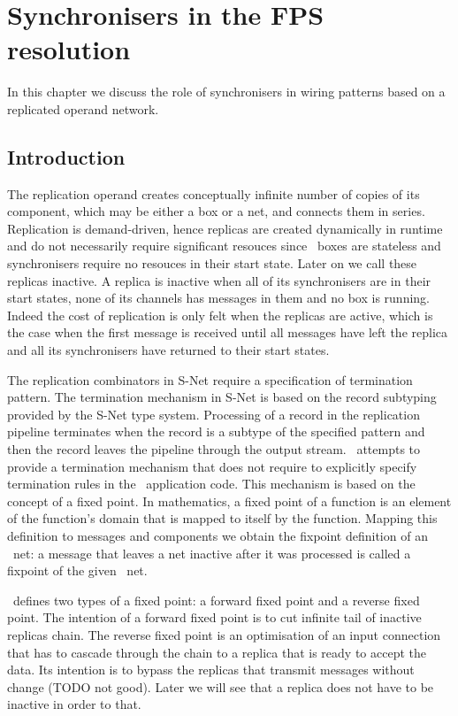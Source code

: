 \chapter{Synchronisers in the FPS resolution}

In this chapter we discuss the role of synchronisers in wiring patterns based on a replicated operand network.


    \section{Introduction}
The replication operand creates conceptually infinite number of copies of its component, which may be either a box or a net, and connects them in series. Replication is demand-driven, hence replicas are created dynamically in runtime and do not necessarily require significant resouces since \ak\ boxes are stateless and synchronisers require no resouces in their start state. Later on we call these replicas inactive. A replica is inactive when all of its synchronisers are in their start states, none of its channels has messages in them and no box is running. Indeed the cost of replication is only felt when the replicas are active, which is the case when the first message is received until all messages have left the replica and all its synchronisers have returned to their start states.

The replication combinators in S-Net require a specification of termination pattern. The termination mechanism in S-Net is based on the record subtyping provided by the S-Net type system. Processing of a record in the replication pipeline terminates when the record is a subtype of the specified pattern and then the record leaves the pipeline through the output stream. \ak\ attempts to provide a termination mechanism that does not require to explicitly specify termination rules in the \ak\ application code. This mechanism is based on the concept of a fixed point. In mathematics, a fixed point of a function is an element of the function's domain that is mapped to itself by the function. Mapping this definition to messages and components we obtain the fixpoint definition of an \ak\ net: a message that leaves a net inactive after it was processed is called a fixpoint of the given \ak\ net.

\ak\ defines two types of a fixed point: a forward fixed point and a reverse fixed point. The intention of a forward fixed point is to cut infinite tail of inactive replicas chain. The reverse fixed point is an optimisation of an input connection that has to cascade through the chain to a replica that is ready to accept the data. Its intention is to bypass the replicas that transmit messages without change (TODO not good). Later we will see that a replica does not have to be inactive in order to that.

